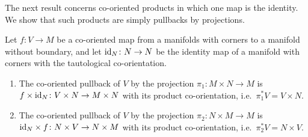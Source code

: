 The next result concerns co-oriented products in which one map is the identity.
We show that such products are simply pullbacks by projections.

\begin{proposition}\label{P: projection pullbacks}
	Let $f \colon V \to M$ be a co-oriented map from a manifolds with corners to a manifold without boundary, and let $\mathrm{id}_N \colon N \to N$ be the identity map of a manifold with corners with the tautological co-orientation.
	\begin{enumerate}
		\item The co-oriented pullback of $V$ by the projection $\pi_1 \colon M \times N \to M$ is $f \times \mathrm{id}_N \colon V \times N \to M \times N$ with its product co-orientation, i.e.\ $\pi_1^*V = V \times N$.
		\item The co-oriented pullback of $V$ by the projection $\pi_2 \colon N \times M \to M$ is $\mathrm{id}_N \times f \colon N \times V \to N \times M$ with its product co-orientation, i.e.\ $\pi_2^*V = N \times V$.
	\end{enumerate}
\end{proposition}

